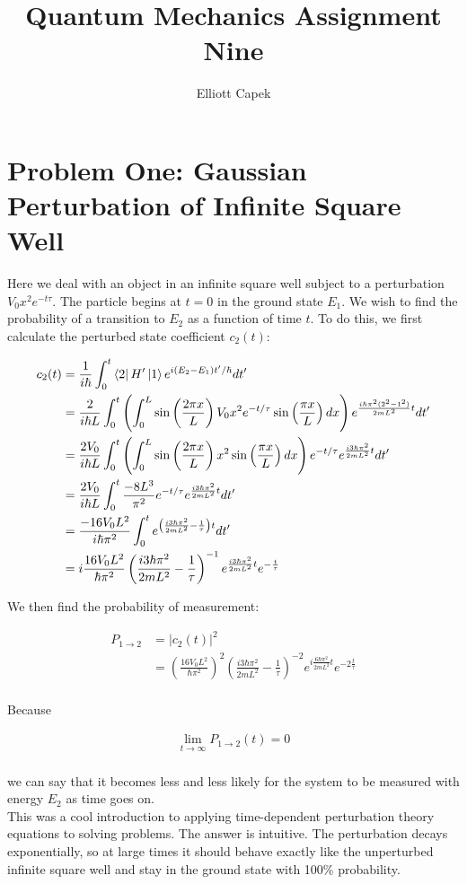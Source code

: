 \documentclass[10pt]{article} %
\title{Quantum Mechanics Assignment Nine}
\author{Elliott Capek}
\begin{document}
\maketitle{}

\section{Problem One: Gaussian Perturbation of Infinite Square Well}
Here we deal with an object in an infinite square well subject to a perturbation $V_0x^2e^{-t\tau}$.
The particle begins at $t=0$ in the ground state $E_1$. We wish to find the probability of a
transition to $E_2$ as a function of time $t$. To do this, we first calculate the perturbed
state coefficient $c_2(t)$:

\begin{align*}
  c_2(t) &= \frac{1}{i\hbar}\int_0^t\bra{2}H'\ket{1}e^{i(E_2-E_1)t'/\hbar}dt'\\
  &= \frac{2}{i\hbar L}\int_0^t
  \left(\int_0^L\sin\left(\frac{2\pi x}{L}\right)
  V_0x^2e^{-t/\tau}\sin\left(\frac{\pi x}{L}\right)dx\right)
  e^{\frac{i\hbar\pi^2(2^2-1^2)}{2mL^2}t}dt'\\
  &= \frac{2V_0}{i\hbar L}\int_0^t
  \left(\int_0^L\sin\left(\frac{2\pi x}{L}\right)
  x^2\sin\left(\frac{\pi x}{L}\right)dx\right)
  e^{-t/\tau}e^{\frac{i3\hbar\pi^2}{2mL^2}t}dt'\\
  &= \frac{2V_0}{i\hbar L}\int_0^t\frac{-8L^3}{\pi^2}e^{-t/\tau}e^{\frac{i3\hbar\pi^2}{2mL^2}t}dt'\\
  &= \frac{-16V_0L^2}{i\hbar\pi^2}
  \int_0^te^{\left(\frac{i3\hbar\pi^2}{2mL^2} - \frac{1}{\tau}\right)t}dt'\\
  &= i\frac{16V_0L^2}{\hbar\pi^2}\left(\frac{i3\hbar\pi^2}{2mL^2} - \frac{1}{\tau}\right)^{-1}
  e^{\frac{i3\hbar\pi^2}{2mL^2}t}e^{-\frac{t}{\tau}}\\
\end{align*}

We then find the probability of measurement:

\begin{align*}
  P_{1\rightarrow2} &= |c_2(t)|^2\\
  &= \left(\frac{16V_0L^2}{\hbar\pi^2}\right)^2
  \left(\frac{i3\hbar\pi^2}{2mL^2} - \frac{1}{\tau}\right)^{-2}
  e^{i\frac{6\hbar\pi^2}{2mL^2}t}e^{-2\frac{t}{\tau}}\\
\end{align*}

Because

\begin{align*}
  \lim_{t\rightarrow\infty} P_{1\rightarrow2}(t) = 0\\
\end{align*}

we can say that it becomes less and less likely for the system to be measured with energy
$E_2$ as time goes on.\\

This was a cool introduction to applying time-dependent perturbation theory equations to solving
problems. The answer is intuitive. The perturbation decays exponentially, so at large times it
should behave exactly like the unperturbed infinite square well and stay in the ground state with
100\% probability.\\
\end{document}

